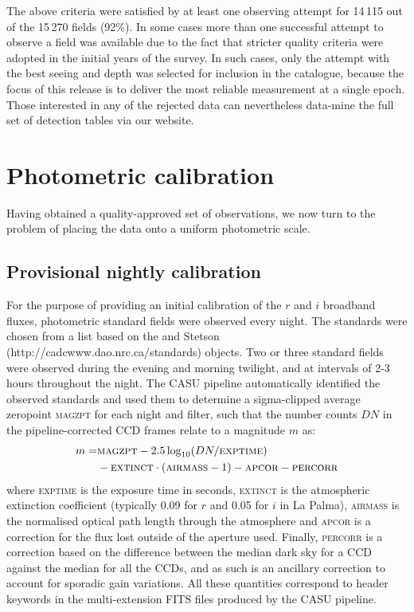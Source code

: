 \documentclass[useAMS,usenatbib]{mn2e}
\begin{document}
The above criteria were satisfied by at least one observing attempt
for 14\,115 out of the 15\,270 fields (92\%).
In some cases more than one successful attempt to observe
a field was available due to the fact that stricter
quality criteria were adopted in the initial years of the survey.
In such cases, only the attempt 
with the best seeing and depth was selected
for inclusion in the catalogue, because the focus 
of this release is to deliver the most reliable
measurement at a single epoch.
Those interested in any of the rejected data 
can nevertheless data-mine the full set of detection tables 
via our website.


\section{Photometric calibration}
\label{sec:calibration}

Having obtained a quality-approved set of observations,
we now turn to the problem of placing the data
onto a uniform photometric scale.

\subsection{Provisional nightly calibration}

For the purpose of providing an initial calibration 
of the $r$ and $i$ broadband fluxes,
photometric standard fields were observed every night.
The standards were chosen from a list based on 
the \cite{Landolt1992} and Stetson (http://cadcwww.dao.nrc.ca/standards) 
objects.
Two or three standard fields were observed 
during the evening and morning twilight,
and at intervals of 2-3 hours throughout the night.
The CASU pipeline automatically identified the observed standards 
and used them to determine a sigma-clipped average zeropoint \textsc{magzpt}
for each night and filter,
such that the number counts $DN$ 
in the pipeline-corrected CCD frames
relate to a magnitude $m$ as:
\begin{equation}
\begin{split}
   m  = & \textsc{magzpt} - 2.5 \log_{10}( DN / \textsc{exptime} ) \\
 &  - \textsc{extinct}\cdot(\textsc{airmass}-1) - \textsc{apcor} - \textsc{percorr}
\label{eqn:mag}
\end{split}
\end{equation}
where \textsc{exptime} is the exposure time in seconds,
\textsc{extinct} is the atmospheric extinction coefficient 
(typically 0.09 for $r$ and 0.05 for $i$ in La Palma),
\textsc{airmass} is the normalised optical path length 
through the atmosphere and
\textsc{apcor} is a correction for the flux
lost outside of the aperture used.
Finally, \textsc{percorr} is a correction based on the difference
between the median dark sky for a CCD against the median for all the CCDs, 
and as such is an ancillary correction 
to account for sporadic gain variations. 
All these quantities correspond to header keywords in the 
multi-extension FITS files produced by the CASU pipeline.
\end{document}
